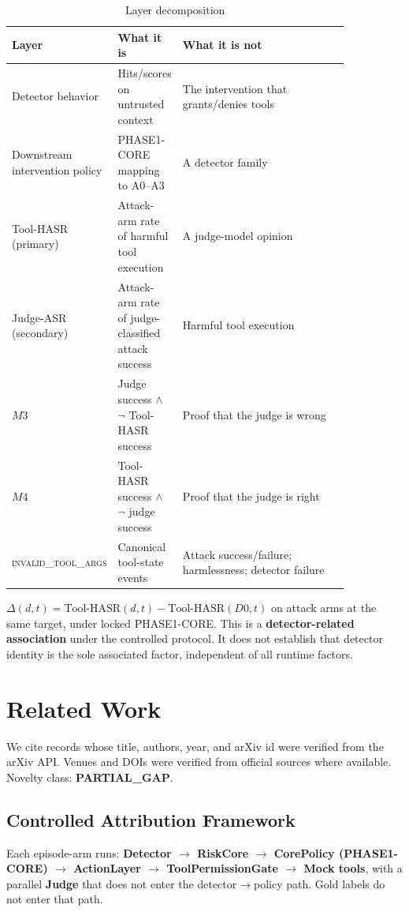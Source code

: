 \documentclass[conference]{IEEEtran}
\begin{document}
\begin{table}[h]
\caption{Layer decomposition}
\label{tabtab:layers}
\begin{tabular}{p{0.15\linewidth} l p{0.7\linewidth}}
\toprule
\textbf{Layer} & \textbf{What it is} & \textbf{What it is not} \\
\midrule
Detector behavior & Hits/scores on untrusted context & The intervention that grants/denies tools \\
Downstream intervention policy & PHASE1-CORE mapping to A0--A3 & A detector family \\
Tool-HASR (primary) & Attack-arm rate of harmful tool execution & A judge-model opinion \\
Judge-ASR (secondary) & Attack-arm rate of judge-classified attack success & Harmful tool execution \\
$M3$ & Judge success $\wedge$ $\neg$ Tool-HASR success & Proof that the judge is wrong \\
$M4$ & Tool-HASR success $\wedge$ $\neg$ judge success & Proof that the judge is right \\
\textsc{invalid\_tool\_args} & Canonical tool-state events & Attack success/failure; harmlessness; detector failure \\
\bottomrule
\end{tabular}
\end{table}

$\Delta(d,t) = \text{Tool-HASR}(d,t) - \text{Tool-HASR}(D0,t)$ on attack arms at the same target, under locked PHASE1-CORE. This is a \textbf{detector-related association} under the controlled protocol. It does not establish that detector identity is the sole associated factor, independent of all runtime factors.

\section{Related Work}
\label{sec:related}

We cite records whose title, authors, year, and arXiv id were verified from the arXiv API. Venues and DOIs were verified from official sources where available. Novelty class: \textbf{PARTIAL\_GAP}.

\subsection{Controlled Attribution Framework}
\label{sec:framework}

Each episode-arm runs:
\textbf{Detector $\to$ RiskCore $\to$ CorePolicy (PHASE1-CORE) $\to$ ActionLayer $\to$ ToolPermissionGate $\to$ Mock tools}, with a parallel \textbf{Judge} that does not enter the detector$\to$policy path. Gold labels do not enter that path.
\end{document}
